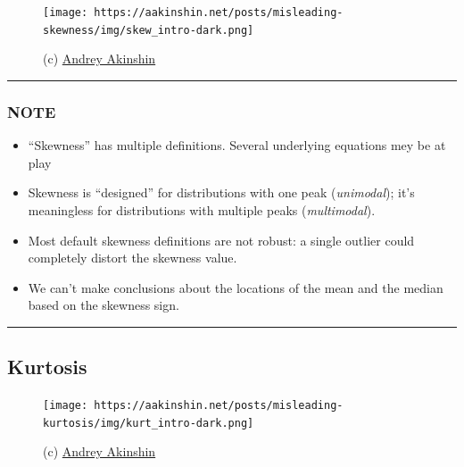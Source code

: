 \documentclass[
  letterpaper,
  DIV=11,
  numbers=noendperiod]{scrreprt}
\providecommand{\tightlist}{%
  \setlength{\itemsep}{0pt}\setlength{\parskip}{0pt}}\usepackage{longtable,booktabs,array}
\begin{document}
\begin{figure}

{\centering \texttt{[image: https://aakinshin.net/posts/misleading-skewness/img/skew\_intro-dark.png]}

}

\caption{(c)
\href{https://aakinshin.net/posts/misleading-skewness/}{Andrey
Akinshin}}

\end{figure}

\begin{center}\rule{0.5\linewidth}{0.5pt}\end{center}

\hypertarget{note}{%
\subsubsection{\texorpdfstring{\textbf{NOTE}}{NOTE}}\label{note}}

\begin{itemize}
\tightlist
\item
  ``Skewness'' has multiple definitions. Several underlying equations
  mey be at play
\item
  Skewness is ``designed'' for distributions with one peak
  (\emph{unimodal}); it's meaningless for distributions with multiple
  peaks (\emph{multimodal}).
\item
  Most default skewness definitions are not robust: a single outlier
  could completely distort the skewness value.
\item
  We can't make conclusions about the locations of the mean and the
  median based on the skewness sign.
\end{itemize}

\begin{center}\rule{0.5\linewidth}{0.5pt}\end{center}

\hypertarget{kurtosis}{%
\subsection{Kurtosis}\label{kurtosis}}

\begin{figure}

{\centering \texttt{[image: https://aakinshin.net/posts/misleading-kurtosis/img/kurt\_intro-dark.png]}

}

\caption{(c)
\href{https://aakinshin.net/posts/misleading-kurtosis/}{Andrey
Akinshin}}

\end{figure}
\end{document}
